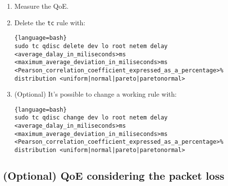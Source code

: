 \begin{enumerate}
  Example:

  \begin{enumerate}
  \item Add the rule:
    
    \begin{lstlisting}{language=bash}
sudo tc qdisc add dev lo root netem delay 100ms 10ms 25% distribution normal
    \end{lstlisting}
    
  \item Check that the rule has been installed with the command:
    
    \begin{lstlisting}{language=bash}
tc qdisc show dev lo
    \end{lstlisting}
    
    that should output:
    
    \begin{lstlisting}{language=bash}
qdisc netem 8009: root refcnt 2 limit 1000 delay 100ms  10ms 25%
    \end{lstlisting}
  \end{enumerate}

\item Measure the QoE.

\item Delete the \verb|tc| rule with:
  
  \begin{lstlisting}{language=bash}
sudo tc qdisc delete dev lo root netem delay <average_dalay_in_miliseconds>ms <maximum_average_deviation_in_miliseconds>ms <Pearson_correlation_coefficient_expressed_as_a_percentage>% distribution <uniform|normal|pareto|paretonormal>
  \end{lstlisting}

\item (Optional) It's possible to change a working rule with:

  \begin{lstlisting}{language=bash}
sudo tc qdisc change dev lo root netem delay <average_dalay_in_miliseconds>ms <maximum_average_deviation_in_miliseconds>ms <Pearson_correlation_coefficient_expressed_as_a_percentage>% distribution <uniform|normal|pareto|paretonormal>
  \end{lstlisting}
  
\end{enumerate}

\subsection{(Optional) QoE considering the packet loss}


